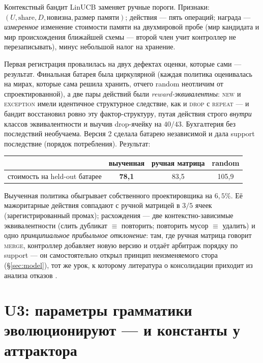 \documentclass{article}
\begin{document}
Контекстный бандит LinUCB заменяет ручные пороги. Признаки: $(U,
\text{share}, D, \text{новизна}, \text{размер памяти})$; действия ---
пять операций; награда --- \emph{измеренное} изменение стоимости
памяти на двухмировой пробе (мир кандидата и мир происхождения
ближайшей схемы --- второй член учит контроллер не перезаписывать),
минус небольшой налог на хранение.

Первая регистрация провалилась на двух дефектах оценки, которые сами
--- результат. Финальная батарея была циркулярной (каждая политика
оценивалась на мирах, которые сама решила хранить, отчего random
неотличим от спроектированной), а две пары действий были
\emph{reward-эквивалентны}: \textsc{new} и \textsc{exception} имели
идентичное структурное следствие, как и \textsc{drop} с
\textsc{repeat} --- и бандит восстановил ровно эту фактор-структуру,
путая действия строго \emph{внутри} классов эквивалентности и выучив
drop-ячейку на $40/43$. Бухгалтерия без последствий необучаема.
Версия 2 сделала батарею независимой и дала support последствие
(порядок потребления). Результат:

\begin{center}
\small
\begin{tabular}{lccc}
\toprule
 & выученная & ручная матрица & random \\
\midrule
стоимость на held-out батарее & \textbf{78{,}1} & 83{,}5 & 105{,}9 \\
\bottomrule
\end{tabular}
\end{center}

Выученная политика обыгрывает собственного проектировщика на
$6{,}5\%$. Её мажоритарные действия совпадают с ручной матрицей в
$3/5$ ячеек (зарегистрированный промах); расхождения --- две
контекстно-зависимые эквивалентности (слить дубликат $\equiv$
повторить; повторить мусор $\equiv$ удалить) и одно
\emph{принципиальное прибыльное отклонение}: там, где ручная матрица
говорит \textsc{merge}, контроллер добавляет новую версию и отдаёт
арбитраж порядку по support --- он самостоятельно открыл принцип
неизменяемого стора (\S\ref{sec:model}), тот же урок, к которому
литература о консолидации приходит из анализа отказов
\citep{trustmem2026,faulty2026}.

\section{U3: параметры грамматики эволюционируют --- и константы у аттрактора}
\label{sec:u3}
\end{document}
